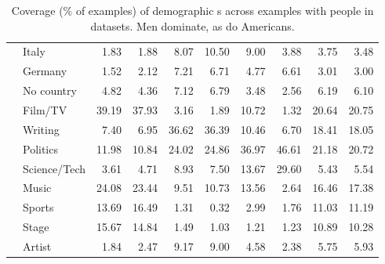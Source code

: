 \begin{table}[t]
{\begin{tabular}{cl*{8}{R}}
            & Italy
				& 1.83	& 1.88
				& 8.07	& 10.50
				& 9.00	& 3.88
				& 3.75	& 3.48
				\\
            & Germany        
				& 1.52	& 2.12
				& 7.21	& 6.71
				& 4.77	& 6.61
				& 3.01	& 3.00
				\\

            & No country 
				& 4.82	& 4.36
				& 7.12	& 6.79
				& 3.48	& 2.56
				& 6.19	& 6.10
				\\

        \midrule
            & Film/TV
				& 39.19	& 37.93
				& 3.16	& 1.89
				& 10.72	& 1.32
				& 20.64	& 20.75
				\\
            
            & Writing 
				& 7.40	& 6.95
				& 36.62	& 36.39
				& 10.46	& 6.70
				& 18.41	& 18.05
				\\
				
            & Politics 
				& 11.98	& 10.84
				& 24.02	& 24.86
				& 36.97	& 46.61
				& 21.18	& 20.72
				\\
				
            & Science/Tech
				& 3.61	& 4.71
				& 8.93	& 7.50
				& 13.67	& 29.60
				& 5.43	& 5.54
				\\
				
            & Music  
				& 24.08	& 23.44
				& 9.51	& 10.73
				& 13.56	& 2.64
				& 16.46	& 17.38
				\\
				
            & Sports
				& 13.69	& 16.49
				& 1.31	& 0.32
				& 2.99	& 1.76
				& 11.03	& 11.19
				\\
				
            & Stage
				& 15.67	& 14.84
				& 1.49	& 1.03
				& 1.21	& 1.23
				& 10.89	& 10.28
				\\
			
			& Artist
				& 1.84	& 2.47
				& 9.17	& 9.00
				& 4.58	& 2.38
				& 5.75	& 5.93
				\\
				
        \bottomrule
        \end{tabular}
    }
    \caption{\label{table-dataset-demographics} Coverage (\% of examples) of demographic \demorow{}s across examples with people in  datasets. Men dominate, as do Americans.}
    \label{tab:demographics}
\end{table}



